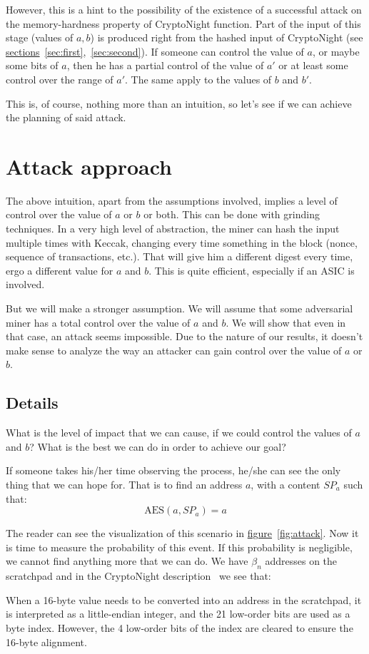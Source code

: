 However, this is a hint to the possibility of the existence of a successful attack on the memory-hardness property of CryptoNight function. Part of the input of this stage (values of $a,b$) is produced right from the hashed input of CryptoNight (see \hyperref[sec:first]{sections}~\ref{sec:first},~\ref{sec:second}). If someone can control the value of $a$, or maybe some bits of $a$, then he has a partial control of the value of $a'$ or at least some control over the range of $a'$. The same apply to the values of $b$ and $b'$.

This is, of course, nothing more than an intuition, so let's see if we can achieve the planning of said attack.
\section{Attack approach}
The above intuition, apart from the assumptions involved, implies a level of control over the value of $a$ or $b$ or both. This can be done with grinding techniques. In a very high level of abstraction, the miner can hash the input multiple times with Keccak, changing every time something in the block (nonce, sequence of transactions, etc.). That will give him a different digest every time, ergo a different value for $a$ and $b$. This is quite efficient, especially if an ASIC is involved.

But we will make a stronger assumption. We will assume that some adversarial miner has a total control over the value of $a$ and $b$. We will show that even in that case, an attack seems impossible. Due to the nature of our results, it doesn't make sense to analyze the way an attacker can gain control over the value of $a$ or $b$.

\subsection{Details}
What is the level of impact that we can cause, if we could control the values of $a$ and $b$? What is the best we can do in order to achieve our goal?

If someone takes his/her time observing the process, he/she can see the only thing that we can hope for. That is to find an address $a$, with a content $SP_a$ such that:
\begin{equation} \nonumber
  \mbox{AES}(a,SP_a) = a
\end{equation}

The reader can see the visualization of this scenario in \hyperref[fig:attack]{figure}~\ref{fig:attack}. Now it is time to measure the probability of this event. If this probability is negligible, we cannot find anything more that we can do. We have $\beta_n$ addresses on the scratchpad and in the CryptoNight description~\cite{cryptonight} we see that:
\begin{quoting}
  When a 16-byte value needs to be converted into an address in
  the scratchpad, it is interpreted as a little-endian integer,
  and the 21 low-order bits are used as a byte index. However,
  the 4 low-order bits of the index are cleared to ensure the
  16-byte alignment.
\end{quoting}

